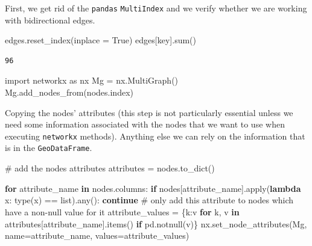 \documentclass[
  letterpaper,
  DIV=11,
  numbers=noendperiod]{scrreprt}
\newenvironment{Shaded}{\begin{snugshade}}{\end{snugshade}}
\newcommand{\BuiltInTok}[1]{\textcolor[rgb]{0.00,0.23,0.31}{#1}}
\newcommand{\CommentTok}[1]{\textcolor[rgb]{0.37,0.37,0.37}{#1}}
\newcommand{\ControlFlowTok}[1]{\textcolor[rgb]{0.00,0.23,0.31}{\textbf{#1}}}
\newcommand{\ImportTok}[1]{\textcolor[rgb]{0.00,0.46,0.62}{#1}}
\newcommand{\KeywordTok}[1]{\textcolor[rgb]{0.00,0.23,0.31}{\textbf{#1}}}
\newcommand{\NormalTok}[1]{\textcolor[rgb]{0.00,0.23,0.31}{#1}}
\newcommand{\OperatorTok}[1]{\textcolor[rgb]{0.37,0.37,0.37}{#1}}
\newcommand{\StringTok}[1]{\textcolor[rgb]{0.13,0.47,0.30}{#1}}
\newcommand{\VariableTok}[1]{\textcolor[rgb]{0.07,0.07,0.07}{#1}}
\begin{document}
First, we get rid of the \texttt{pandas} \texttt{MultiIndex} and we
verify whether we are working with bidirectional edges.

\begin{Shaded}
\begin{Highlighting}[]
\NormalTok{edges.reset\_index(inplace }\OperatorTok{=} \VariableTok{True}\NormalTok{)}
\NormalTok{edges[}\StringTok{\textquotesingle{}key\textquotesingle{}}\NormalTok{].}\BuiltInTok{sum}\NormalTok{()}
\end{Highlighting}
\end{Shaded}

\begin{verbatim}
96
\end{verbatim}

\begin{Shaded}
\begin{Highlighting}[]
\ImportTok{import}\NormalTok{ networkx }\ImportTok{as}\NormalTok{ nx}
\NormalTok{Mg }\OperatorTok{=}\NormalTok{ nx.MultiGraph()   }
\NormalTok{Mg.add\_nodes\_from(nodes.index)}
\end{Highlighting}
\end{Shaded}

Copying the nodes' attributes (this step is not particularly essential
unless we need some information associated with the nodes that we want
to use when executing \texttt{networkx} methods). Anything else we can
rely on the information that is in the \texttt{GeoDataFrame}.

\begin{Shaded}
\begin{Highlighting}[]
\CommentTok{\# add the nodes\textquotesingle{} attributes}
\NormalTok{attributes }\OperatorTok{=}\NormalTok{ nodes.to\_dict()}

\ControlFlowTok{for}\NormalTok{ attribute\_name }\KeywordTok{in}\NormalTok{ nodes.columns:}
    \ControlFlowTok{if}\NormalTok{ nodes[attribute\_name].}\BuiltInTok{apply}\NormalTok{(}\KeywordTok{lambda}\NormalTok{ x: }\BuiltInTok{type}\NormalTok{(x) }\OperatorTok{==} \BuiltInTok{list}\NormalTok{).}\BuiltInTok{any}\NormalTok{(): }
        \ControlFlowTok{continue} 
    \CommentTok{\# only add this attribute to nodes which have a non{-}null value for it}
\NormalTok{    attribute\_values }\OperatorTok{=}\NormalTok{ \{k:v }\ControlFlowTok{for}\NormalTok{ k, v }\KeywordTok{in}\NormalTok{ attributes[attribute\_name].items() }\ControlFlowTok{if}\NormalTok{ pd.notnull(v)\}}
\NormalTok{    nx.set\_node\_attributes(Mg, name}\OperatorTok{=}\NormalTok{attribute\_name, values}\OperatorTok{=}\NormalTok{attribute\_values)}
\end{Highlighting}
\end{Shaded}
\end{document}
